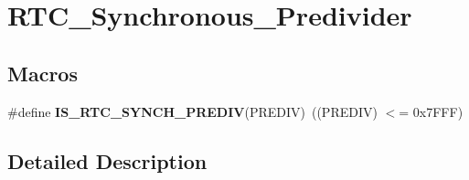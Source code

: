 \hypertarget{group___r_t_c___synchronous___predivider}{}\section{R\+T\+C\+\_\+\+Synchronous\+\_\+\+Predivider}
\label{group___r_t_c___synchronous___predivider}
\subsection*{Macros}
\begin{DoxyCompactItemize}
\item 
\hypertarget{group___r_t_c___synchronous___predivider_ga32fccaa6ec65f9fceb3e6e4f31ab11cf}{}\#define {\bfseries I\+S\+\_\+\+R\+T\+C\+\_\+\+S\+Y\+N\+C\+H\+\_\+\+P\+R\+E\+D\+I\+V}(P\+R\+E\+D\+I\+V)~((P\+R\+E\+D\+I\+V) $<$= 0x7\+F\+F\+F)\label{group___r_t_c___synchronous___predivider_ga32fccaa6ec65f9fceb3e6e4f31ab11cf}

\end{DoxyCompactItemize}


\subsection{Detailed Description}
